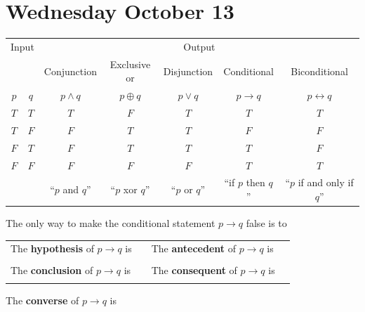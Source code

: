 \documentclass[12pt, oneside]{article}
\begin{document}
\section*{Wednesday October 13}


\begin{center}
    \begin{tabular}{cc||c|c|c|c|c}
    \multicolumn{2}{c||}{Input}  & \multicolumn{5}{c}{Output} \\
     & & Conjunction &  Exclusive or & Disjunction  &  Conditional & Biconditional  \\
    $p$ & $q$ & $p \wedge q$ &  $p  \oplus  q$ & $p \vee  q$ & $p \to q$ & $p \leftrightarrow q$\\
    \hline
    $T$ & $T$ & $T$ & $F$ & $T$ & $T$& $T$\\
    $T$ & $F$ & $F$ & $T$ & $T$ & $F$& $F$\\
    $F$ & $T$ & $F$ & $T$ & $T$ & $T$& $F$\\
    $F$ & $F$ & $F$ & $F$ & $F$ & $T$& $T$\\
    \hline
    && ``$p$ and $q$'' & ``$p$ xor $q$'' & ``$p$ or $q$'' & ``if $p$ then $q$'' & ``$p$ if and only if $q$''
    \end{tabular}
\end{center}
     

The only way to make  the conditional statement $p \to q$ false is to \underline{\phantom{\hspace{3in}}}\\

\begin{tabular}{llll}
The {\bf  hypothesis}  of $p \to q$ is  &\underline{\phantom{\hspace{1in}}} &
The {\bf  antecedent}  of $p \to q$ is  &\underline{\phantom{\hspace{1in}}} \\
&&&  \\
The {\bf  conclusion}  of $p \to q$ is & \underline{\phantom{\hspace{1in}}}&
The {\bf  consequent}  of $p \to q$ is & \underline{\phantom{\hspace{1in}}}\\
&&&  \\
\end{tabular}
 

The {\bf converse}  of $p \to q$ is \underline{}\\
\end{document}
